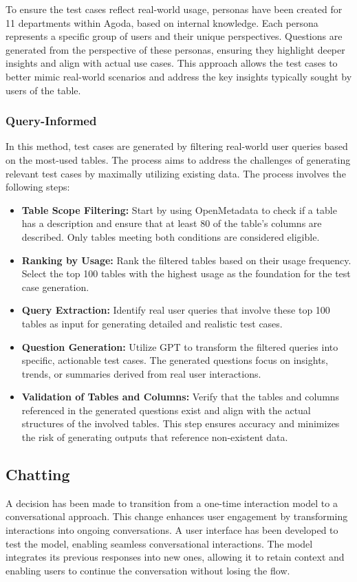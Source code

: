         To ensure the test cases reflect real-world usage, personas have been created for 11 departments within Agoda, based on internal knowledge. Each persona represents a specific group of users and their unique perspectives. Questions are generated from the perspective of these personas, ensuring they highlight deeper insights and align with actual use cases. This approach allows the test cases to better mimic real-world scenarios and address the key insights typically sought by users of the table.
        \subsubsection{Query-Informed}
        In this method, test cases are generated by filtering real-world user queries based on the most-used tables. The process aims to address the challenges of generating relevant test cases by maximally utilizing existing data. The process involves the following steps:
        \begin{itemize}
          \item \textbf{Table Scope Filtering:} Start by using OpenMetadata to check if a table has a description and ensure that at least 80\text{\%} of the table's columns are described. Only tables meeting both conditions are considered eligible.
          \item \textbf{Ranking by Usage:} Rank the filtered tables based on their usage frequency. Select the top 100 tables with the highest usage as the foundation for the test case generation.
          \item \textbf{Query Extraction:} Identify real user queries that involve these top 100 tables as input for generating detailed and realistic test cases.
          \item \textbf{Question Generation:} Utilize GPT to transform the filtered queries into specific, actionable test cases. The generated questions focus on insights, trends, or summaries derived from real user interactions.
          \item \textbf{Validation of Tables and Columns:} Verify that the tables and columns referenced in the generated questions exist and align with the actual structures of the involved tables. This step ensures accuracy and minimizes the risk of generating outputs that reference non-existent data.
        \end{itemize}
    \subsection{Chatting}
    A decision has been made to transition from a one-time interaction model to a conversational approach. This change enhances user engagement by transforming interactions into ongoing conversations. A user interface has been developed to test the model, enabling seamless conversational interactions. The model integrates its previous responses into new ones, allowing it to retain context and enabling users to continue the conversation without losing the flow.

